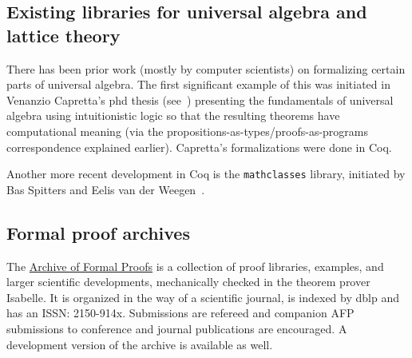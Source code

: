 \documentclass[11pt]{amsart}  %
\begin{document}

\subsection{Existing libraries for universal algebra and lattice theory}
There has been prior work (mostly by computer scientists) on formalizing certain parts of universal algebra. The first significant example of this was initiated in Venanzio Capretta's phd thesis (see~\cite{capretta:1999}) presenting the fundamentals of universal algebra using intuitionistic logic so that the resulting theorems have computational meaning (via the propositions-as-types/proofs-as-programs correspondence explained earlier).  Capretta's formalizations were done in Coq.

Another more recent development in Coq is the {\tt mathclasses} library, initiated by Bas Spitters and Eelis van der Weegen~\cite{MR2678760}. 

\subsection{Formal proof archives}
The \href{https://www.isa-afp.org/}{Archive of Formal Proofs} is a collection of proof libraries, examples, and larger scientific developments, mechanically checked in the theorem prover Isabelle. It is organized in the way of a scientific journal, is indexed by dblp and has an ISSN: 2150-914x.
Submissions are refereed and companion AFP submissions to conference and journal publications are encouraged. A development version of the archive is available as well.








\end{document}
